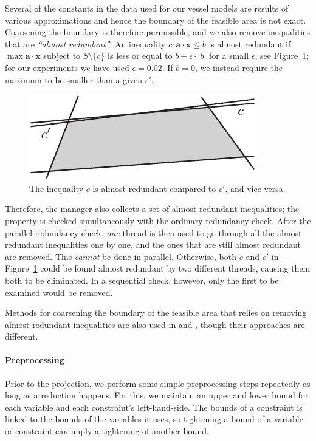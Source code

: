 \documentclass{llncs}
\newcommand{\ve}{\mathbf}
\begin{document}
Several of the constants in the data used for our vessel models are results of various approximations and hence the boundary of the feasible area is not exact. Coarsening the boundary is therefore permissible, and we also remove inequalities that are \emph{``almost redundant''}. An inequality $c: \ve{a}\cdot\ve{x}\leq b$ is almost redundant if $\max \ve{a}\cdot\ve{x}$ subject to $S\setminus\{c\}$ is less or equal to $b + \epsilon\cdot |b|$ for a small $\epsilon$, see Figure~\ref{fig:almostRedundant}; for our experiments we have used $\epsilon = 0.02$. If $b=0$, we instead require the maximum to be smaller than a given $\epsilon'$. 
\begin{figure}[tb]
	\centering
		\includegraphics[scale=0.7]{figures/almostRedundant2.pdf}
	\caption{The inequality $c$ is almost redundant compared to $c'$, and vice versa.}
	\label{fig:almostRedundant}
\end{figure}
Therefore, the manager also collects a set of almost redundant inequalities; the property is checked simultaneously with the ordinary redundancy check. After the parallel redundancy check, \emph{one} thread is then used to go through all the almost redundant inequalities one by one, and the ones that are still almost redundant are removed. 
%
This \emph{cannot} be done in parallel. Otherwise, both $c$ and $c'$ in Figure~\ref{fig:almostRedundant} could be found almost redundant by two different threads, causing them both to be eliminated. In a sequential check, however, only the first to be examined would be removed. 

Methods for coarsening the boundary of the feasible area that relies on removing almost redundant inequalities are also used in \cite{lukatskii08} and \cite{shapot12}, though their approaches are different.

\paragraph{Preprocessing}
Prior to the projection, we perform some simple preprocessing steps repeatedly as long as a reduction happens. For this, we maintain an upper and lower bound for each variable and each constraint's left-hand-side. 
The bounds of a constraint is linked to the bounds of the variables it uses, so tightening a bound of a variable or constraint can imply a tightening of another bound. 
\end{document}
